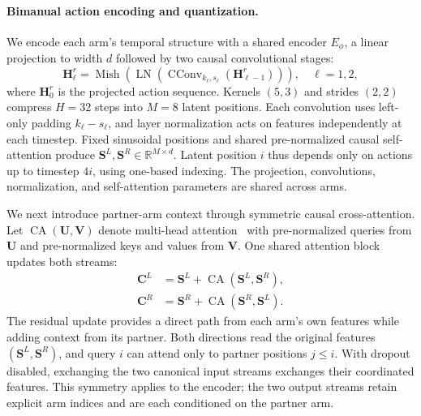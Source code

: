 \paragraph{Bimanual action encoding and quantization.}
We encode each arm's temporal structure with a shared encoder $E_{\phi}$,
a linear projection to width $d$ followed by two causal convolutional
stages:
\begin{equation}
    \mathbf{H}^{r}_{\ell}
    =\operatorname{Mish}\!\left(
    \operatorname{LN}\!\left(
    \operatorname{CConv}_{k_{\ell},s_{\ell}}
    (\mathbf{H}^{r}_{\ell-1})\right)\right),
    \quad \ell=1,2,
    \label{eq:bicat_temporal}
\end{equation}
where $\mathbf{H}^{r}_{0}$ is the projected action sequence. Kernels $(5,3)$
and strides $(2,2)$ compress $H=32$ steps into $M=8$ latent positions.
Each convolution uses left-only padding $k_{\ell}-s_{\ell}$, and layer
normalization acts on features independently at each timestep. Fixed
sinusoidal positions and shared pre-normalized causal self-attention produce
$\mathbf{S}^{L},\mathbf{S}^{R}\in\mathbb{R}^{M\times d}$.
Latent position $i$ thus depends only on actions up to timestep $4i$, using
one-based indexing. The projection, convolutions, normalization, and
self-attention parameters are shared across arms.

We next introduce partner-arm context through symmetric causal
cross-attention. Let $\operatorname{CA}(\mathbf{U},\mathbf{V})$ denote
multi-head attention~\cite{vaswani2017attention} with pre-normalized queries from $\mathbf{U}$ and
pre-normalized keys and values from $\mathbf{V}$. One shared attention block
updates both streams:
\begin{equation}
    \begin{aligned}
        \mathbf{C}^{L}&=\mathbf{S}^{L}
        +\operatorname{CA}(\mathbf{S}^{L},\mathbf{S}^{R}),\\
        \mathbf{C}^{R}&=\mathbf{S}^{R}
        +\operatorname{CA}(\mathbf{S}^{R},\mathbf{S}^{L}).
    \end{aligned}
    \label{eq:bicat_coordination}
\end{equation}
The residual update provides a direct path from each arm's own features while
adding context from its partner. Both directions read the original features
$(\mathbf{S}^{L},\mathbf{S}^{R})$, and query $i$ can attend only to partner
positions $j\leq i$. With dropout disabled, exchanging the
two canonical input streams exchanges their coordinated features. This
symmetry applies to the encoder; the two output streams retain explicit arm
indices and are each conditioned on the partner arm.

